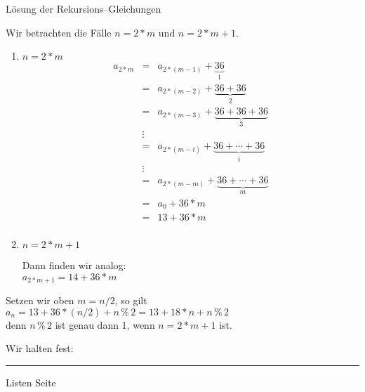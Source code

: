 \begin{slide}{}
\normalsize

\begin{center}
L\"osung der Rekursions--Gleichungen
\end{center}
\vspace*{0.5cm}

\footnotesize
Wir betrachten die F\"alle $n = 2*m$ und $n = 2* m + 1$.
\begin{enumerate}
\item $n = 2 * m$
      $$
      \begin{array}{lcl}
      a_{2 * m} & = & a_{2 * (m-1)} + \underbrace{36}_1 \\
                & = & a_{2 * (m-2)} + \underbrace{36 + 36}_2 \\
                & = & a_{2 * (m-3)} + \underbrace{36 + 36 + 36}_3 \\
                & \vdots &                                  \\    
                & = & a_{2 * (m-i)} + \underbrace{36 + \cdots + 36}_i \\
                & \vdots &                                  \\    
                & = & a_{2 * (m-m)} + \underbrace{36 + \cdots + 36}_m \\
                & = & a_{0} + 36 * m \\[0.3cm]
                & = & 13 + 36 * m \\
      \end{array}
      $$
\item $n = 2 * m + 1$
     
       Dann finden wir analog: \\[0.3cm]
       \hspace*{1.3cm}  $a_{2*m + 1} = 14 + 36 * m$
\end{enumerate}
Setzen wir oben $m = n / 2$, so gilt \\[0.3cm]
\hspace*{1.3cm} $a_n = 13 + 36 * (n/2) + n\,\%\,2 = 13 + 18 * n + n\,\%\,2$ \\[0.3cm]
denn $n\,\%\,2$ ist genau dann 1, wenn $n = 2*m + 1$ ist.

Wir halten fest: \\[0.3cm]
\hspace*{5.3cm} 


\vspace*{\fill}
\tiny \addtocounter{mypage}{1}
\rule{17cm}{1mm}
Listen  \hspace*{\fill} Seite 
\end{slide}

